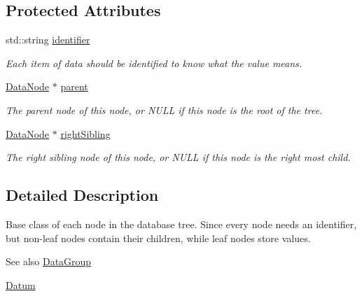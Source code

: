 \subsection*{Protected Attributes}
\begin{DoxyCompactItemize}
\item 
std\+::string \hyperlink{classDatabase_1_1DataNode_ace59a7fba9c490d2dae59c4af7b0c71f}{identifier}
\begin{DoxyCompactList}\small\item\em Each item of data should be identified to know what the value means. \end{DoxyCompactList}\item 
\hyperlink{classDatabase_1_1DataNode}{Data\+Node} $\ast$ \hyperlink{classDatabase_1_1DataNode_a8d70472d0f14aa3ae3ee74d9f3e879d6}{parent}\hypertarget{classDatabase_1_1DataNode_a8d70472d0f14aa3ae3ee74d9f3e879d6}{}\label{classDatabase_1_1DataNode_a8d70472d0f14aa3ae3ee74d9f3e879d6}

\begin{DoxyCompactList}\small\item\em The parent node of this node, or N\+U\+LL if this node is the root of the tree. \end{DoxyCompactList}\item 
\hyperlink{classDatabase_1_1DataNode}{Data\+Node} $\ast$ \hyperlink{classDatabase_1_1DataNode_ae335fc33c3813e8a6638d50faef44d5d}{right\+Sibling}\hypertarget{classDatabase_1_1DataNode_ae335fc33c3813e8a6638d50faef44d5d}{}\label{classDatabase_1_1DataNode_ae335fc33c3813e8a6638d50faef44d5d}

\begin{DoxyCompactList}\small\item\em The right sibling node of this node, or N\+U\+LL if this node is the right most child. \end{DoxyCompactList}\end{DoxyCompactItemize}


\subsection{Detailed Description}
Base class of each node in the database tree. Since every node needs an identifier, but non-\/leaf nodes contain their children, while leaf nodes store values. 

\begin{DoxySeeAlso}{See also}
\hyperlink{classDatabase_1_1DataGroup}{Data\+Group} 

\hyperlink{classDatabase_1_1Datum}{Datum} 
\end{DoxySeeAlso}


